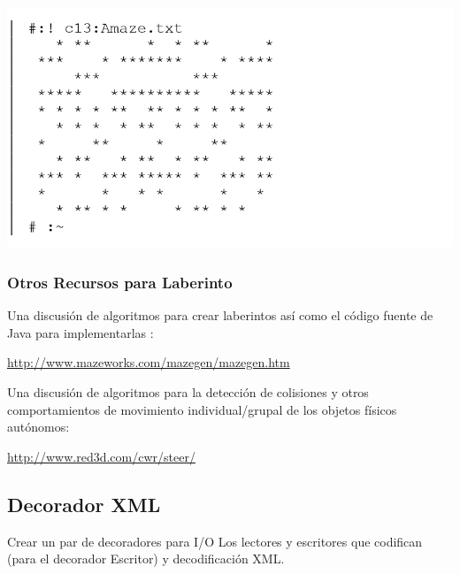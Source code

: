 \documentclass{article}
\begin{document}
\includegraphics[width=\textwidth]{ultimaimagenTIP}

\subsubsection{Otros Recursos para Laberinto}

Una discusión de algoritmos para crear laberintos así como el código fuente de Java para implementarlas : \newline

\textcolor[rgb]{0.2,0.5,0.7}{\underline{http://www.mazeworks.com/mazegen/mazegen.htm}} \newline      %

Una discusión de algoritmos para la detección de colisiones y otros comportamientos de movimiento individual/grupal de los objetos físicos autónomos: \newline

\textcolor[rgb]{0.2,0.5,0.7}{\underline{http://www.red3d.com/cwr/steer/}}

\subsection{Decorador XML}

Crear un par de decoradores para I/O Los lectores y escritores que codifican (para el decorador Escritor) y decodificación XML.
\end{document}
